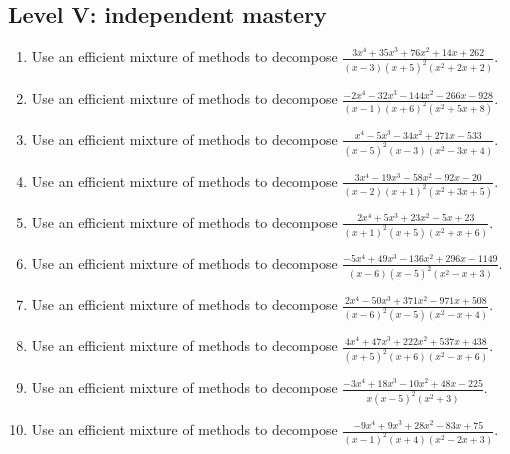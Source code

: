 \documentclass[11pt,oneside]{book}
\begin{document}
\subsection*{Level V: independent mastery}
\begin{enumerate}[leftmargin=*,label=\textbf{\arabic*.},itemsep=0.65\baselineskip]
\item Use an efficient mixture of methods to decompose $\displaystyle \frac{3 x^{4} + 35 x^{3} + 76 x^{2} + 14 x + 262}{\left(x - 3\right) \left(x + 5\right)^{2} \left(x^{2} + 2 x + 2\right)}$.
\item Use an efficient mixture of methods to decompose $\displaystyle \frac{- 2 x^{4} - 32 x^{3} - 144 x^{2} - 266 x - 928}{\left(x - 1\right) \left(x + 6\right)^{2} \left(x^{2} + 5 x + 8\right)}$.
\item Use an efficient mixture of methods to decompose $\displaystyle \frac{x^{4} - 5 x^{3} - 34 x^{2} + 271 x - 533}{\left(x - 5\right)^{2} \left(x - 3\right) \left(x^{2} - 3 x + 4\right)}$.
\item Use an efficient mixture of methods to decompose $\displaystyle \frac{3 x^{4} - 19 x^{3} - 58 x^{2} - 92 x - 20}{\left(x - 2\right) \left(x + 1\right)^{2} \left(x^{2} + 3 x + 5\right)}$.
\item Use an efficient mixture of methods to decompose $\displaystyle \frac{2 x^{4} + 5 x^{3} + 23 x^{2} - 5 x + 23}{\left(x + 1\right)^{2} \left(x + 5\right) \left(x^{2} + x + 6\right)}$.
\item Use an efficient mixture of methods to decompose $\displaystyle \frac{- 5 x^{4} + 49 x^{3} - 136 x^{2} + 296 x - 1149}{\left(x - 6\right) \left(x - 5\right)^{2} \left(x^{2} - x + 3\right)}$.
\item Use an efficient mixture of methods to decompose $\displaystyle \frac{2 x^{4} - 50 x^{3} + 371 x^{2} - 971 x + 508}{\left(x - 6\right)^{2} \left(x - 5\right) \left(x^{2} - x + 4\right)}$.
\item Use an efficient mixture of methods to decompose $\displaystyle \frac{4 x^{4} + 47 x^{3} + 222 x^{2} + 537 x + 438}{\left(x + 5\right)^{2} \left(x + 6\right) \left(x^{2} - x + 6\right)}$.
\item Use an efficient mixture of methods to decompose $\displaystyle \frac{- 3 x^{4} + 18 x^{3} - 10 x^{2} + 48 x - 225}{x \left(x - 5\right)^{2} \left(x^{2} + 3\right)}$.
\item Use an efficient mixture of methods to decompose $\displaystyle \frac{- 9 x^{4} + 9 x^{3} + 28 x^{2} - 83 x + 75}{\left(x - 1\right)^{2} \left(x + 4\right) \left(x^{2} - 2 x + 3\right)}$.
\end{enumerate}
\end{document}
